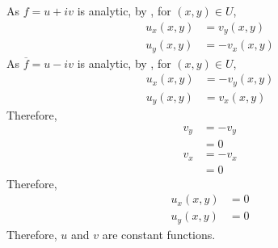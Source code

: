 \documentclass[fleqn, a4paper, 12pt, twoside]{article}
\theoremstyle{definition}
\theoremstyle{theorem}
\begin{document}
\begin{solution}
	As $f = u + i v$ is analytic, by , for $(x,y) \in U$,
	\begin{align*}
		u_x(x,y) & = v_y(x,y) \\
		u_y(x,y) & = -v_x(x,y)
	\end{align*}
	As $\overline{f} = u - i v$ is analytic, by , for $(x,y) \in U$,
	\begin{align*}
		u_x(x,y) & = -v_y(x,y) \\
		u_y(x,y) & = v_x(x,y)
	\end{align*}
	Therefore,
	\begin{align*}
		v_y & = -v_y \\
                    & = 0    \\
		v_x & = -v_x \\
                    & = 0
	\end{align*}
	Therefore,
	\begin{align*}
		u_x(x,y) & = 0 \\
		u_y(x,y) & = 0
	\end{align*}
	Therefore, $u$ and $v$ are constant functions.
\end{solution}
\end{document}
